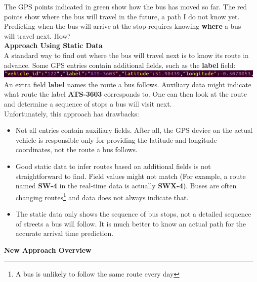 \documentclass[12pt,a4paper,oneside,openright]{report}
\begin{document}
The GPS points indicated in green show how the bus has moved so far.
The red points show where the bus will travel in the future,
a path I do not know yet. Predicting when the bus will arrive at the stop
requires knowing \textbf{where} a bus will travel next. How? \\

\textbf{Approach Using Static Data} \\

A standard way to find out where the bus will travel next is to know its 
route in advance. Some GPS entries contain additional fields,
such as the \textbf{label} field: \\

\includegraphics[width=\textwidth, scale=1.2]{figs/labelled_entry.png} \\

An extra field \textbf{label} names the route a bus follows. Auxiliary
data might indicate what route the label \textbf{ATS-3603} corresponds to.
One can then look at the route and determine a sequence of stops 
a bus will visit next. \\

Unfortunately, this approach has drawbacks:

\begin{itemize}
\item Not all entries contain auxiliary fields. After all, the GPS device on the
actual vehicle is responsible only for providing the latitude and longitude
coordinates, not the route a bus follows.

\item Good static data to infer routes based on additional fields is not 
straightforward to find. Field values might not match
(For example, a route named \textbf{SW-4} in the real-time data is actually
\textbf{SWX-4}).
Buses are often changing routes\footnote{A bus is unlikely to follow the same route
every day} and data does not always indicate that.

\item The static data only shows the sequence of bus stops, not a detailed
sequence of streets a bus will follow. It is much better to know an actual
path for the accurate arrival time prediction.
\end{itemize}

\textbf{New Approach Overview} \\
\end{document}
